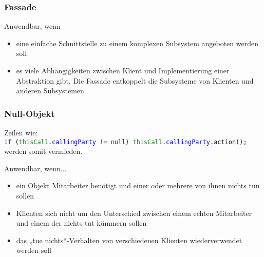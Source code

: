 \subsubsection{Fassade}
Anwendbar, wenn
\begin{itemize}
    \item eine einfache Schnittstelle zu einem komplexen Subsystem angeboten werden soll
    \item es viele Abhängigkeiten zwischen Klient und Implementierung einer Abstraktion gibt. Die Fassade entkoppelt die Subsysteme von Klienten und anderen Subsystemen
\end{itemize}



\subsubsection{Null-Objekt}
Zeilen wie:\\
\texttt{\textcolor{purple}{if} (\textcolor{ForestGreen}{thisCall}.\textcolor{blue}{callingParty} != \textcolor{purple}{null}) \textcolor{ForestGreen}{thisCall}.\textcolor{blue}{callingParty}.action();}\\
werden somit vermieden.\\

Anwendbar, wenn...
\begin{itemize}
    \item ein Objekt Mitarbeiter benötigt und einer oder mehrere von ihnen nichts tun sollen
    \item Klienten sich nicht um den Unterschied zwischen einem echten Mitarbeiter und einem der nichts tut kümmern sollen
    \item das „tue nichts“-Verhalten von verschiedenen Klienten wiederverwendet werden soll
\end{itemize}